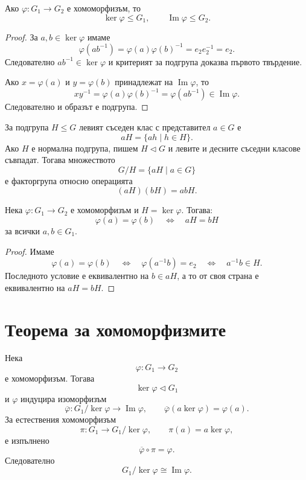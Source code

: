 \begin{prop}
Ако $\varphi\colon G_1\to G_2$ е хомоморфизъм, то
\[
\ker\varphi\le G_1,
\qquad
\operatorname{Im}\varphi\le G_2.
\]
\end{prop}

\begin{proof}
За $a,b\in\ker\varphi$ имаме
\[
\varphi(ab^{-1})
=
\varphi(a)\varphi(b)^{-1}
=
e_2e_2^{-1}
=
e_2.
\]
Следователно $ab^{-1}\in\ker\varphi$ и критерият за подгрупа доказва първото твърдение.

Ако $x=\varphi(a)$ и $y=\varphi(b)$ принадлежат на $\operatorname{Im}\varphi$, то
\[
xy^{-1}
=
\varphi(a)\varphi(b)^{-1}
=
\varphi(ab^{-1})\in\operatorname{Im}\varphi.
\]
Следователно и образът е подгрупа.
\end{proof}

За подгрупа $H\le G$ левият съседен клас с представител $a\in G$ е
\[
aH=\{ah\mid h\in H\}.
\]
Ако $H$ е нормална подгрупа, пишем $H\triangleleft G$ и левите и десните съседни класове съвпадат. Тогава множеството
\[
G/H=\{aH\mid a\in G\}
\]
е факторгрупа относно операцията
\[
(aH)(bH)=abH.
\]

\begin{prop}
Нека $\varphi\colon G_1\to G_2$ е хомоморфизъм и $H=\ker\varphi$. Тогава:
\[
\varphi(a)=\varphi(b)
\quad\Longleftrightarrow\quad
aH=bH
\]
за всички $a,b\in G_1$.
\end{prop}

\begin{proof}
Имаме
\[
\varphi(a)=\varphi(b)
\quad\Longleftrightarrow\quad
\varphi(a^{-1}b)=e_2
\quad\Longleftrightarrow\quad
a^{-1}b\in H.
\]
Последното условие е еквивалентно на $b\in aH$, а то от своя страна е еквивалентно на $aH=bH$.
\end{proof}

\section{Теорема за хомоморфизмите}\label{s:31.5}

\begin{keythm}
Нека
\[
\varphi\colon G_1\to G_2
\]
е хомоморфизъм. Тогава
\[
\ker\varphi\triangleleft G_1
\]
и $\varphi$ индуцира изоморфизъм
\[
\overline{\varphi}\colon G_1/\ker\varphi\longrightarrow\operatorname{Im}\varphi,
\qquad
\overline{\varphi}(a\ker\varphi)=\varphi(a).
\]
За естествения хомоморфизъм
\[
\pi\colon G_1\to G_1/\ker\varphi,
\qquad
\pi(a)=a\ker\varphi,
\]
е изпълнено
\[
\overline{\varphi}\circ\pi=\varphi.
\]
Следователно
\[
G_1/\ker\varphi\cong\operatorname{Im}\varphi.
\]
\end{keythm}

